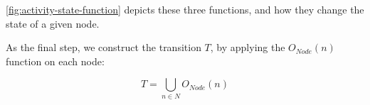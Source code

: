 \autoref{fig:activity-state-function} depicts these three functions, and how they change the state of a given node.

\fi

As the final step, we construct the transition \(T\), by applying the \(O_\mathit{Node}(n)\) function on each node:

\begin{equation*}
	T = \bigcup_{n \in N} O_\mathit{Node}(n)
\end{equation*}
